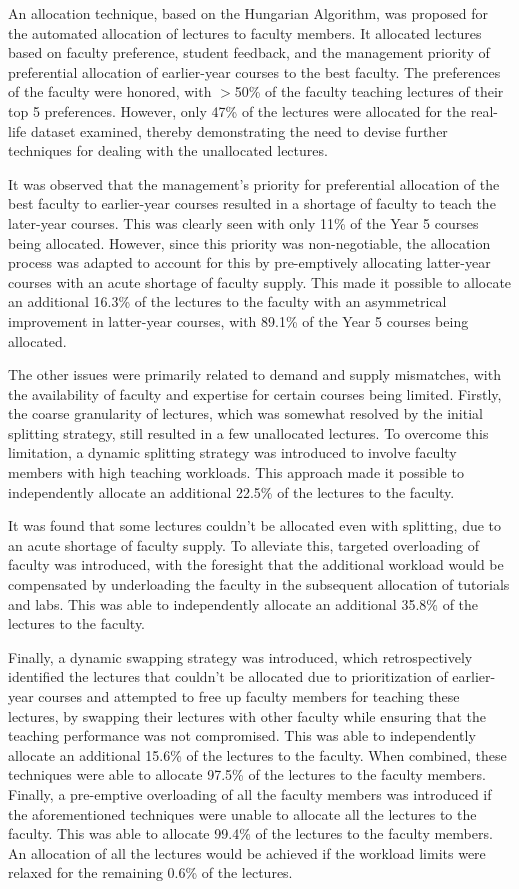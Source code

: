 An allocation technique, based on the Hungarian Algorithm, was proposed for the automated allocation of lectures to faculty members. It allocated lectures based on faculty preference, student feedback, and the management priority of preferential allocation of earlier-year courses to the best faculty. The preferences of the faculty were honored, with $>$50\% of the faculty teaching lectures of their top 5 preferences. However, only 47\% of the lectures were allocated for the real-life dataset examined, thereby demonstrating the need to devise further techniques for dealing with the unallocated lectures.

It was observed that the management's priority for preferential allocation of the best faculty to earlier-year courses resulted in a shortage of faculty to teach the later-year courses. This was clearly seen with only 11\% of the Year 5 courses being allocated. However, since this priority was non-negotiable, the allocation process was adapted to account for this by pre-emptively allocating latter-year courses with an acute shortage of faculty supply. This made it possible to allocate an additional 16.3\% of the lectures to the faculty with an asymmetrical improvement in latter-year courses, with 89.1\% of the Year 5 courses being allocated.

The other issues were primarily related to demand and supply mismatches, with the availability of faculty and expertise for certain courses being limited. Firstly, the coarse granularity of lectures, which was somewhat resolved by the initial splitting strategy, still resulted in a few unallocated lectures. To overcome this limitation, a dynamic splitting strategy was introduced to involve faculty members with high teaching workloads. This approach made it possible to independently allocate an additional 22.5\% of the lectures to the faculty.

It was found that some lectures couldn't be allocated even with splitting, due to an acute shortage of faculty supply. To alleviate this, targeted overloading of faculty was introduced, with the foresight that the additional workload would be compensated by underloading the faculty in the subsequent allocation of tutorials and labs. This was able to independently allocate an additional 35.8\% of the lectures to the faculty.

Finally, a dynamic swapping strategy was introduced, which retrospectively identified the lectures that couldn't be allocated due to prioritization of earlier-year courses and attempted to free up faculty members for teaching these lectures, by swapping their lectures with other faculty while ensuring that the teaching performance was not compromised. This was able to independently allocate an additional 15.6\% of the lectures to the faculty. When combined, these techniques were able to allocate 97.5\% of the lectures to the faculty members. Finally, a pre-emptive overloading of all the faculty members was introduced if the aforementioned techniques were unable to allocate all the lectures to the faculty. This was able to allocate 99.4\% of the lectures to the faculty members. An allocation of all the lectures would be achieved if the workload limits were relaxed for the remaining 0.6\% of the lectures.

